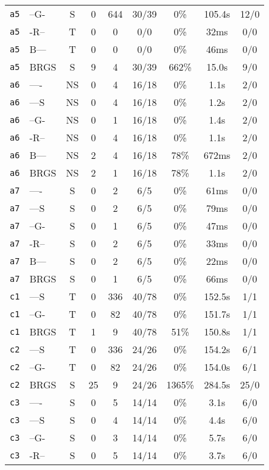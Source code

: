 \begin{tabular}{llccccccc}
\texttt{a5} & --G- & S & 0 & 644 & 30/39 & 0\% & 105.4s & 12/0 \\
\texttt{a5} & -R-- & T & 0 & 0 & 0/0 & 0\% & 32ms & 0/0 \\
\texttt{a5} & B--- & T & 0 & 0 & 0/0 & 0\% & 46ms & 0/0 \\
\texttt{a5} & BRGS & S & 9 & 4 & 30/39 & 662\% & 15.0s & 9/0 \\
\texttt{a6} & ---- & NS & 0 & 4 & 16/18 & 0\% & 1.1s & 2/0 \\
\texttt{a6} & ---S & NS & 0 & 4 & 16/18 & 0\% & 1.2s & 2/0 \\
\texttt{a6} & --G- & NS & 0 & 1 & 16/18 & 0\% & 1.4s & 2/0 \\
\texttt{a6} & -R-- & NS & 0 & 4 & 16/18 & 0\% & 1.1s & 2/0 \\
\texttt{a6} & B--- & NS & 2 & 4 & 16/18 & 78\% & 672ms & 2/0 \\
\texttt{a6} & BRGS & NS & 2 & 1 & 16/18 & 78\% & 1.1s & 2/0 \\
\texttt{a7} & ---- & S & 0 & 2 & 6/5 & 0\% & 61ms & 0/0 \\
\texttt{a7} & ---S & S & 0 & 2 & 6/5 & 0\% & 79ms & 0/0 \\
\texttt{a7} & --G- & S & 0 & 1 & 6/5 & 0\% & 47ms & 0/0 \\
\texttt{a7} & -R-- & S & 0 & 2 & 6/5 & 0\% & 33ms & 0/0 \\
\texttt{a7} & B--- & S & 0 & 2 & 6/5 & 0\% & 22ms & 0/0 \\
\texttt{a7} & BRGS & S & 0 & 1 & 6/5 & 0\% & 66ms & 0/0 \\
\texttt{c1} & ---S & T & 0 & 336 & 40/78 & 0\% & 152.5s & 1/1 \\
\texttt{c1} & --G- & T & 0 & 82 & 40/78 & 0\% & 151.7s & 1/1 \\
\texttt{c1} & BRGS & T & 1 & 9 & 40/78 & 51\% & 150.8s & 1/1 \\
\texttt{c2} & ---S & T & 0 & 336 & 24/26 & 0\% & 154.2s & 6/1 \\
\texttt{c2} & --G- & T & 0 & 82 & 24/26 & 0\% & 154.0s & 6/1 \\
\texttt{c2} & BRGS & S & 25 & 9 & 24/26 & 1365\% & 284.5s & 25/0 \\
\texttt{c3} & ---- & S & 0 & 5 & 14/14 & 0\% & 3.1s & 6/0 \\
\texttt{c3} & ---S & S & 0 & 4 & 14/14 & 0\% & 4.4s & 6/0 \\
\texttt{c3} & --G- & S & 0 & 3 & 14/14 & 0\% & 5.7s & 6/0 \\
\texttt{c3} & -R-- & S & 0 & 5 & 14/14 & 0\% & 3.7s & 6/0 \\

\end{tabular}
